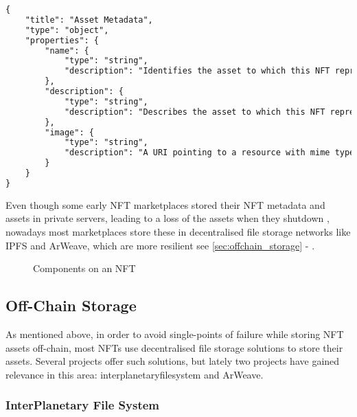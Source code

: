 


\begin{lstlisting}[language=HTML, caption={ERC721 Metadata JSON Schema}]
{
    "title": "Asset Metadata",
    "type": "object",
    "properties": {
        "name": {
            "type": "string",
            "description": "Identifies the asset to which this NFT represents"
        },
        "description": {
            "type": "string",
            "description": "Describes the asset to which this NFT represents"
        },
        "image": {
            "type": "string",
            "description": "A URI pointing to a resource with mime type image/* representing the asset to which this NFT represents. Consider making any images at a width between 320 and 1080 pixels and aspect ratio between 1.91:1 and 4:5 inclusive."
        }
    }
}
\end{lstlisting}

Even though some early NFT marketplaces stored their NFT metadata and assets in private servers, leading to a loss of the assets when they shutdown \cite{gallenHistoryNFTMarketplaces2023}, nowadays most marketplaces store these in decentralised file storage networks like IPFS and ArWeave, which are more resilient  see \autoref{sec:offchain_storage} - .


\begin{figure}[h]
    \centering
    
    \caption[Components on an NFT]{Components on an NFT}
    \label{fig:nftcomponents}
\end{figure}



\subsection{Off-Chain Storage}
\label{sec:offchain_storage}

As mentioned above, in order to avoid single-points of failure while storing NFT assets off-chain, most NFTs use decentralised file storage solutions to store their assets. Several projects offer such solutions, but lately two projects have gained relevance in this area: \gls{interplanetaryfilesystem} and ArWeave. 


\subsubsection{InterPlanetary File System}
\label{sec:ipfs}

